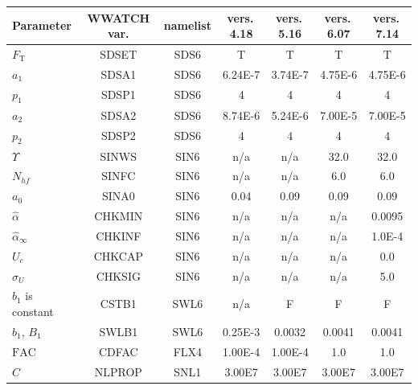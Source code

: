 \begin{table} \begin{center}
\footnotesize
\begin{threeparttable}
\begin{tabular}{|l|c|c|c|c|c|c|} \hline \hline
Parameter          &  WWATCH var. & namelist &  vers.\,4.18 & vers.\,5.16 & vers.\,6.07 & vers.\,7.14 \\
\hline
  $F_{\mathrm{T}}$ &  SDSET       & SDS6     &  T       &  T         & T          & T       \\
  $a_1$            &  SDSA1       & SDS6     & 6.24E-7  & 3.74E-7    & 4.75E-6    & 4.75E-6 \\
  $p_1$            &  SDSP1       & SDS6     &  4       &  4         & 4          & 4       \\
  $a_2$            &  SDSA2       & SDS6     & 8.74E-6  & 5.24E-6    & 7.00E-5    & 7.00E-5 \\
  $p_2$            &  SDSP2       & SDS6     &  4       &  4         & 4          & 4 \\
\hline
  $\Upsilon$\tnote{\textdagger}       &  SINWS       & SIN6     & n/a      & n/a        & 32.0   & 32.0   \\
  $N_{hf}$\tnote{\textdagger}         &  SINFC       & SIN6     & n/a      & n/a        & 6.0    & 6.0    \\
  $a_0$            &  SINA0       & SIN6     & 0.04     & 0.09       & 0.09       &  0.09 \\
  $\hat{\alpha}$        &  CHKMIN & SIN6     & n/a      & n/a        & n/a        &  0.0095 \\
  $\hat{\alpha}_\infty$ &  CHKINF & SIN6     & n/a      & n/a        & n/a        &  1.0E-4 \\
  $U_c$            &  CHKCAP      & SIN6     & n/a      & n/a        & n/a        &  0.0\tnote{\S} \\
  $\sigma_U$       &  CHKSIG      & SIN6     & n/a      & n/a        & n/a        &  5.0 \\
\hline
  $b_1$ is constant&  CSTB1       & SWL6     & n/a      &  F         & F          &  F      \\
  $b_1$, $B_1$     &  SWLB1       & SWL6     & 0.25E-3  & 0.0032     & 0.0041     &  0.0041 \\
\hline
  $\mathrm{FAC}$   &  CDFAC       & FLX4     & 1.00E-4  & 1.00E-4    & 1.0\tnote{\textdaggerdbl} & 1.0       \\
\hline
  $C$              &  NLPROP      & SNL1     & 3.00E7   &  3.00E7    & 3.00E7   & 3.00E7 \\

\end{tabular}
\end{threeparttable}
\end{center}
\end{table}

